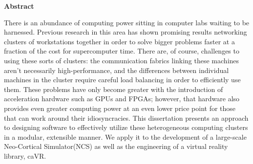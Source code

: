 \newpage
{}
\begin{center}
  {\bf Abstract}
\end{center}

There is an abundance of computing power sitting in computer labs waiting
to be harnessed. Previous research in this area has shown promising results
networking clusters of workstations together in order to solve bigger problems
faster at a fraction of the cost for supercomputer time. There are, of course,
challenges to using these sorts of clusters: the communication fabrics linking
these machines aren't necessarily high-performance, and the differences
between individual machines in the cluster require careful load balancing in
order to efficiently use them. These problems have only become greater with
the introduction of acceleration hardware such as GPUs and FPGAs; however, that
hardware also provides even greater computing power at an even lower price
point for those that can work around their idiosyncracies. This dissertation
presents an approach to designing software to effectively utilize these heterogeneous
computing clusters in a modular, extensible manner. We apply it to the development
of a large-scale Neo-Cortical Simulator(NCS) as well as the engineering of a
virtual reality library, caVR.
